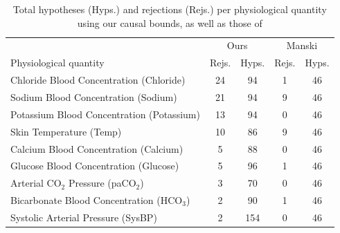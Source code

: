 \begin{table}%
    \centering
\begin{footnotesize}
\begin{tabular}{l|cc|cc}
& \multicolumn{2}{c}{Ours} & \multicolumn{2}{c}{Manski} \\
                   Physiological quantity &  Rejs. &  Hyps. &  Rejs. &  Hyps. \\
\midrule
  Chloride Blood Concentration (Chloride) &            24 &            94 & 1 & 46  \\
      Sodium Blood Concentration (Sodium) &            21 &            94 & 9 & 46  \\
Potassium Blood Concentration (Potassium) &            13 &            94 & 0 & 46  \\
                  Skin Temperature (Temp) &            10 &            86 & 9 & 46  \\
    Calcium Blood Concentration (Calcium) &             5 &            88 & 0 & 46  \\
    Glucose Blood Concentration (Glucose) &             5 &            96 & 1 & 46  \\
      Arterial CO$_2$ Pressure (paCO$_2$) &             3 &            70 & 0 & 46  \\
Bicarbonate Blood Concentration (HCO$_3$) &             2 &            90 & 1 & 46  \\
       Systolic Arterial Pressure (SysBP) &             2 &           154 & 0 & 46  \\
\bottomrule
\end{tabular}
\end{footnotesize}
    \caption{Total hypotheses (Hyps.) and rejections (Rejs.) per physiological quantity using our causal bounds, as well as those of \cite{manski}} \label{tab:hypotheses}
\end{table}

